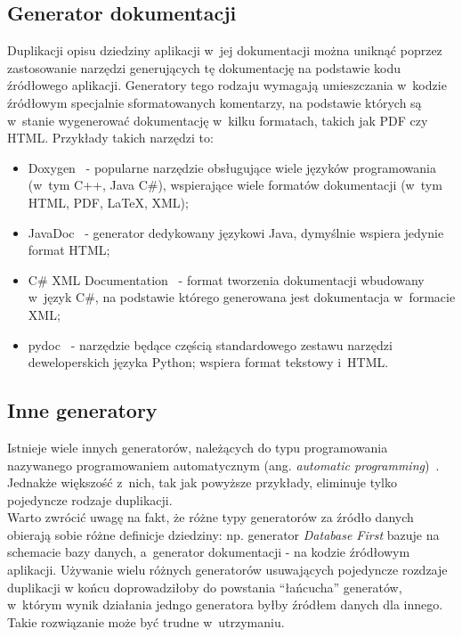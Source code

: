 \subsection{Generator dokumentacji}

Duplikacji opisu dziedziny aplikacji w~jej dokumentacji można uniknąć poprzez zastosowanie narzędzi generujących tę dokumentację na podstawie kodu źródłowego aplikacji.
Generatory tego rodzaju wymagają umieszczania w~kodzie źródłowym specjalnie sformatowanych komentarzy, na podstawie których są w~stanie wygenerować dokumentację w~kilku formatach, takich jak PDF czy HTML.
Przykłady takich narzędzi to:

\begin{itemize}
 \item Doxygen~\cite{doxygen} - popularne narzędzie obsługujące wiele języków programowania (w~tym C++, Java C\#), wspierające wiele formatów dokumentacji (w~tym HTML, PDF, LaTeX, XML);
 \item JavaDoc~\cite{javadoc} - generator dedykowany językowi Java, dymyślnie wspiera jedynie format HTML;
 \item C\# XML Documentation~\cite{msdn:xml_doc} - format tworzenia dokumentacji wbudowany w~język C\#, na podstawie którego generowana jest dokumentacja w~formacie XML;
 \item pydoc~\cite{pydoc} - narzędzie będące częścią standardowego zestawu narzędzi deweloperskich języka Python; wspiera format tekstowy i~HTML.
\end{itemize}


\subsection{Inne generatory}

Istnieje wiele innych generatorów, należących do typu programowania nazywanego programowaniem automatycznym (ang. \emph{automatic programming})~\cite{auto_prog}.
Jednakże większość z~nich, tak jak powyższe przykłady, eliminuje tylko pojedyncze rodzaje duplikacji.\\

Warto zwrócić uwagę na fakt, że różne typy generatorów za źródło danych obierają sobie różne definicje dziedziny: np. generator \emph{Database First} bazuje na schemacie bazy danych, a~generator dokumentacji - na kodzie źródłowym aplikacji.
Używanie wielu różnych generatorów usuwających pojedyncze rozdzaje duplikacji w końcu doprowadziłoby do powstania ``łańcucha'' generatów, w~którym wynik działania jedngo generatora byłby źródłem danych dla innego.
Takie rozwiązanie może być trudne w~utrzymaniu.



